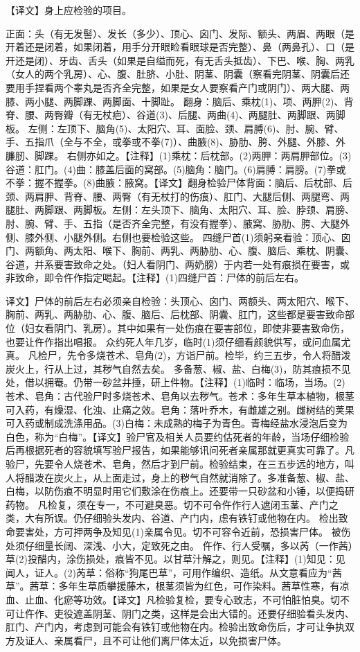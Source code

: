 \documentclass[12pt,UTF8]{ctexbook}
\begin{document}
【译文】身上应检验的项目。

正面：头（有无发髻）、发长（多少）、顶心、囟门、发际、额头、两眉、两眼（是开着还是闭着，如果闭着，用手分开眼睑看眼球是否完整）、鼻（两鼻孔）、口（是开还是闭）、牙齿、舌头（如果是自缢而死，有无舌头抵齿）、下巴、喉、胸、两乳（女人的两个乳房）、心、腹、肚脐、小肚、阴茎、阴囊（察看完阴茎、阴囊后还要用手捏看两个睾丸是否齐全完整，如果是女人要察看产门或阴门）、两大腿、两膝、两小腿、两脚踝、两脚面、十脚趾。
翻身：脑后、乘枕(1)、项、两胛(2)、背脊、腰、两臀瓣（有无杖疤）、谷道(3)、后腿、两曲(4)、两腿肚、两脚跟、两脚板。
左侧：左顶下、脑角(5)、太阳穴、耳、面脸、颈、肩膊(6)、肘、腕、臂、手、五指爪（全与不全，或拳或不拳(7)）、曲腋(8)、胁肋、胯、外腿、外膝、外臁肕、脚踝。
右侧亦如之。【注释】(1)乘枕：后枕部。(2)两胛：两肩胛部位。(3)谷道：肛门。(4)曲：膝盖后面的窝部。(5)脑角：脑门。(6)肩膊：肩膀。(7)拳或不拳：握不握拳。(8)曲腋：腋窝。【译文】翻身检验尸体背面：脑后、后枕部、后颈、两肩胛、背脊、腰、两臀（有无杖打的伤痕）、肛门、大腿后侧、两腿弯、两腿肚、两脚跟、两脚板。左侧：左头顶下、脑角、太阳穴、耳、脸、脖颈、肩膀、肘、腕、臂、手、五指（是否齐全完整，有没有握拳）、腋窝、胁肋、胯、大腿外侧、膝外侧、小腿外侧。右侧也要检验这些。
四缝尸首(1)须躬亲看验：顶心、囟门、两额角、两太阳、喉下、胸前、两乳、两胁肋、心、腹、脑后、乘枕、阴囊、谷道，并系要害致命之处。（妇人看阴门、两奶膀）于内若一处有痕损在要害，或非致命，即令仵作指定喝起。【注释】(1)四缝尸首：尸体的前后左右。

译文】尸体的前后左右必须亲自检验：头顶心、囟门、两额头、两太阳穴、喉下、胸前、两乳、两胁肋、心、腹、脑后、后枕部、阴囊、肛门，这些都是要害致命部位（妇女看阴门、乳房）。其中如果有一处伤痕在要害部位，即使非要害致命伤，也要让仵作指出唱报。
众约死人年几岁，临时(1)须仔细看颜貌供写，或问血属尤真。
凡检尸，先令多烧苍术、皂角(2)，方诣尸前。检毕，约三五步，令人将醋泼炭火上，行从上过，其秽气自然去矣。
多备葱、椒、盐、白梅(3)，防其痕损不见处，借以拥罨。仍带一砂盆并捶，研上件物。【注释】(1)临时：临场，当场。(2)苍术、皂角：古代验尸时多烧苍术、皂角以去秽气。苍术：多年生草本植物，根茎可入药，有燥湿、化浊、止痛之效。皂角：落叶乔木，有雌雄之别。雌树结的荚果可入药或制成洗涤用品。(3)白梅：未成熟的梅子为青色。青梅经盐水浸泡后变为白色，称为“白梅”。【译文】验尸官及相关人员要约估死者的年龄，当场仔细检验后再根据死者的容貌填写验尸报告，如果能够讯问死者亲属那就更真实可靠了。凡验尸，先要令人烧苍术、皂角，然后才到尸前。检验结束，在三五步远的地方，叫人将醋泼在炭火上，从上面走过，身上的秽气自然就消除了。多准备葱、椒、盐、白梅，以防伤痕不明显时用它们敷涂在伤痕上。还要带一只砂盆和小锤，以便捣研药物。
凡检复，须在专一，不可避臭恶。切不可令仵作行人遮闭玉茎、产门之类，大有所误。仍仔细验头发内、谷道、产门内，虑有铁钉或他物在内。
检出致命要害处，方可押两争及知见(1)亲属令见。切不可容令近前，恐损害尸体。
被伤处须仔细量长阔、深浅、小大，定致死之由。
仵作、行人受嘱，多以芮（一作茜）草(2)投醋内，涂伤损处，痕皆不见。以甘草汁解之，则见。【注释】(1)知见：见闻人，证人。(2)芮草：俗称“狗尾巴草”，可用作编织、造纸。从文意看应为“茜草”。茜草：多年生草质攀援藤木，根茎须皆为红色，可作染料。茜草性寒，有凉血、止血、化瘀等功效。【译文】凡检验复检，要专心致志，不可怕脏怕臭。切不可让仵作、吏役遮盖阴茎、阴门之类，这样是会出大错的。还要仔细验看头发内、肛门、产门内，考虑到可能会有铁钉或他物在内。检验出致命伤后，才可让争执双方及证人、亲属看尸，且不可让他们离尸体太近，以免损害尸体。
\end{document}
